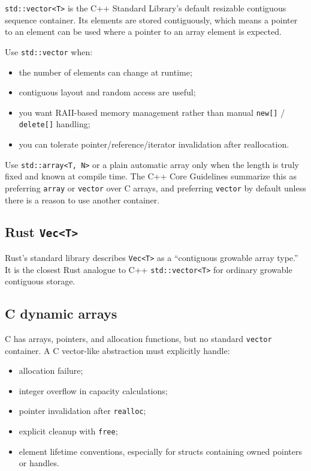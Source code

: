 \documentclass[11pt]{article}
\begin{document}
\texttt{std::vector<T>} is the C++ Standard Library's default resizable contiguous sequence container. Its elements are stored contiguously, which means a pointer to an element can be used where a pointer to an array element is expected. \cite{cppref-vector}

Use \texttt{std::vector} when:
\begin{itemize}
  \item the number of elements can change at runtime;
  \item contiguous layout and random access are useful;
  \item you want RAII-based memory management rather than manual \texttt{new[]} / \texttt{delete[]} handling;
  \item you can tolerate pointer/reference/iterator invalidation after reallocation.
\end{itemize}

Use \texttt{std::array<T, N>} or a plain automatic array only when the length is truly fixed and known at compile time. The C++ Core Guidelines summarize this as preferring \texttt{array} or \texttt{vector} over C arrays, and preferring \texttt{vector} by default unless there is a reason to use another container. \cite{cpp-core-guidelines}

\subsection*{Rust \texttt{Vec<T>}}

Rust's standard library describes \texttt{Vec<T>} as a ``contiguous growable array type.'' It is the closest Rust analogue to C++ \texttt{std::vector<T>} for ordinary growable contiguous storage. \cite{rust-vec}

\subsection*{C dynamic arrays}

C has arrays, pointers, and allocation functions, but no standard \texttt{vector} container. A C vector-like abstraction must explicitly handle:

\begin{itemize}
  \item allocation failure;
  \item integer overflow in capacity calculations;
  \item pointer invalidation after \texttt{realloc};
  \item explicit cleanup with \texttt{free};
  \item element lifetime conventions, especially for structs containing owned pointers or handles.
\end{itemize}
\end{document}
